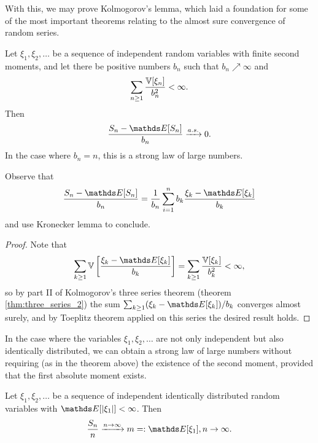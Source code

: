 With this, we may prove Kolmogorov's lemma, which laid a foundation for some of the most important theorems relating to the almost sure convergence of random series.

\begin{theorem}[Kolmogorov]
Let $\xi_1, \xi_2,\dots$ be a sequence of independent random
variables with finite second moments, and let there be positive numbers $b_n$ such that $b_n \nearrow \infty$ and 
\begin{equation*}
    \sum_{n\geq 1} \frac{\mathbb{V}[\xi_n]}{b_n^2} < \infty.
\end{equation*}
Then 
\begin{equation*}
    \frac{S_n - \E[S_n]}{b_n} \xrightarrow{a.s.} 0.
\end{equation*}
In the case where $b_n = n$, this is a strong law of large numbers.
\end{theorem}

\begin{hint}
Observe that 
\begin{equation*}
\frac{S_n - \E[S_n]}{b_n} = \frac{1}{b_n} \sum_{i=1}^n b_k \frac{\xi_k - \E[\xi_k]}{b_k}
\end{equation*}
and use Kronecker lemma to conclude.
\end{hint}

\begin{proof}
Note that 
\begin{equation*}
\sum_{k\geq 1} \V\sqbracket{\frac{\xi_k - \E[\xi_k]}{b_k}} = \sum_{k\geq 1} \frac{\V[\xi_k]}{b_k^2} < \infty,
\end{equation*}
so by part II of Kolmogorov's three series theorem (theorem \ref{thm:three_series_2}) the sum $\sum_{k\geq 1} (\xi_k - \E[\xi_k])/b_k$ converges almost surely, and by Toeplitz theorem applied on this series the desired result holds.
\end{proof}

In the case where the variables $\xi_1, \xi_2, \dots$ are not only independent but also identically distributed, we can obtain a strong law of large numbers without requiring (as in the theorem above) the existence of the second moment, provided that the first absolute moment exists.
\begin{theorem}
Let $\xi_1, \xi_2, \dots$ be a sequence of independent identically distributed random variables with $\E[|\xi_1|]<\infty$. Then
\begin{equation*}
    \frac{S_n}{n} \xrightarrow{n\to\infty} m =: \E[\xi_1], n \to \infty.
\end{equation*}
\end{theorem}

